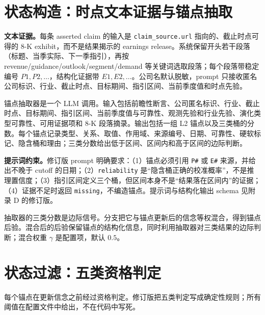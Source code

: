 \section{状态构造：时点文本证据与锚点抽取}

\begin{revbox}
\noindent\textbf{文本证据。}每条 asserted claim 的输入是 \texttt{claim\_source.url} 指向的、截止时点可得的 8-K exhibit，而不是结果揭示的 earnings release。系统保留开头若干段落（标题、当季实际、下一季指引），再按 revenue/guidance/outlook/segment/demand 等关键词选取段落；每个段落带稳定编号 $P1,P2,\dots$，结构化证据带 $E1,E2,\dots$。公司名默认脱敏，prompt 只接收匿名公司标识、行业、截止时点、目标期间、指引区间、当前季度值和时点先验。
\end{revbox}

锚点抽取器是一个 LLM 调用。输入包括前瞻性断言、公司匿名标识、行业、截止时点、目标期间、指引区间、当前季度值与可靠性、观测先验和行业先验、演化类型可靠性、可用证据项和 8-K 段落摘录。输出包括一组 L2 锚点以及三类桶的分数。每个锚点记录类型、关系、取值、作用域、来源编号、日期、可靠性、硬软标记、隐含桶和理由；三类分数给出低于区间、区间内和高于区间的边际判断。

\begin{revbox}
\noindent\textbf{提示词约束。}修订版 prompt 明确要求：（1）锚点必须引用 \texttt{P\#} 或 \texttt{E\#} 来源，并给出不晚于 cutoff 的日期；（2）\texttt{reliability} 是“隐含桶正确的校准概率”，不是推理置信度；（3）指引区间定义三个桶，但区间本身不是“结果落在区间内”的证据；（4）证据不足时返回 \texttt{missing}，不编造锚点。提示词与结构化输出 schema 见附录 D 的修订版。
\end{revbox}

抽取器的三类分数是边际信号。分支把它与锚点更新后的信念等权混合，得到锚点后验。混合后的后验保留锚点的结构化信息，同时利用抽取器对三类结果的边际判断；混合权重 $\gamma$ 是配置项，默认 $0.5$。

\section{状态过滤：五类资格判定}

每个锚点在更新信念之前经过资格判定。修订版把五类判定写成确定性规则；所有阈值在配置文件中给出，不在代码中写死。

